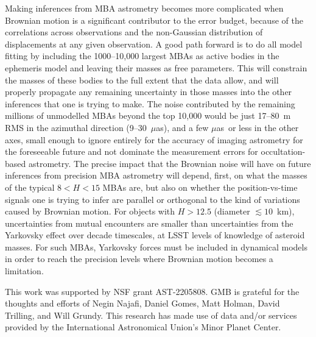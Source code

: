 \documentclass[linenumbers, onecolumn]{aastex631}
\newcommand\edited[1]{{\color{red} {#1}}}
\newcommand{\uas}{$\mu$as}
\begin{document}
Making inferences from MBA astrometry becomes more complicated when
Brownian motion is a significant contributor to the error budget, \edited{because of the
correlations across observations and the non-Gaussian distribution of
displacements at any given observation.}
A good path forward is to do all model fitting by including the 1000--10,000
largest MBAs as active bodies in the ephemeris model and
leaving their masses as free parameters.  This will constrain the
masses of these bodies to the full extent that the data allow, and
will properly propagate any remaining uncertainty in those masses into
the other inferences that one is trying to make.  The noise
contributed by the remaining millions of unmodelled MBAs \edited{beyond the top
  10,000} would be just 17--80~m RMS in the azimuthal direction (9--30~\uas), and a
few \uas\ or less in the other axes, small enough to ignore entirely
for the accuracy of imaging astrometry for the foreseeable future \edited{and not
dominate the measurement errors for
occultation-based astrometry.}
\edited{The precise impact that the Brownian noise will have on future
inferences from  precision MBA astrometry will depend, first, on what the masses
of the typical $8<H<15$ MBAs are, but also on whether
the position-vs-time signals one is trying to infer are parallel or orthogonal to the kind of
variations caused by Brownian motion.  For objects with $H>12.5$ 
 (diameter $\lesssim10$~km),} uncertainties from mutual encounters are
  smaller than uncertainties from the Yarkovsky effect over decade
  timescales, at LSST levels of knowledge of asteroid masses. For such MBAs,
  Yarkovsky forces must be included in dynamical models in order to
  reach the precision levels where Brownian motion becomes a limitation.

\begin{acknowledgments}
  This work was supported by NSF grant AST-2205808.  GMB is grateful for
  the thoughts and efforts of Negin Najafi, Daniel Gomes, Matt Holman,
  David Trilling, and Will Grundy.
  This research has made use of data and/or services provided by the International Astronomical Union's Minor Planet Center. 
\end{acknowledgments}

\newpage


\end{document}
